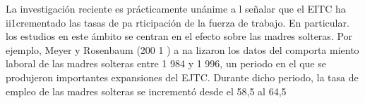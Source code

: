 \documentclass[10pt,a4paper]{article}
\begin{document}
La investigación reciente es prácticamente unánime a l señalar que el EITC ha ii1crementado las tasas de pa rticipación de la fuerza de trabajo. En particular. los estudios en este ámbito se centran en el efecto sobre las madres solteras. Por ejemplo, Meyer y Rosenbaum (200 1 ) a na lizaron los datos del comporta miento laboral de las madres solteras entre 1 984 y 1 996, un periodo en el que se produjeron importantes expansiones del EJTC. Durante dicho periodo, la tasa de empleo de las madres solteras se incrementó desde el 58,5 al 64,5%
\end{document}
